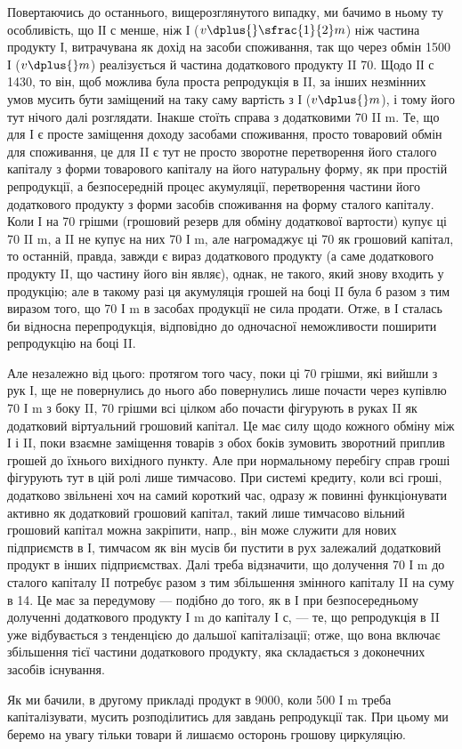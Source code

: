 
Повертаючись до останнього, вищерозглянутого випадку, ми бачимо
в ньому ту особливість, що ІІ с менше, ніж І ($v \dplus{} \sfrac{1}{2} m$) ніж частина
продукту І, витрачувана як дохід на засоби споживання, так що через
обмін 1500 І ($v \dplus{} m$) реалізується й частина додаткового продукту II \deq{} 70.
Щодо ІІ с \deq{} 1430, то він, щоб можлива була проста репродукція в II,
за інших незмінних умов мусить бути заміщений на таку саму вартість
з І ($v \dplus{} m$), і тому його тут нічого далі розглядати. Інакше стоїть
справа з додатковими 70 II m. Те, що для І є просте заміщення доходу
засобами споживання, просто товаровий обмін для споживання, це для II
є тут не просто зворотне перетворення його сталого капіталу з форми
товарового капіталу на його натуральну форму, як при простій репродукції,
а безпосередній процес акумуляції, перетворення частини його
додаткового продукту з форми засобів споживання на форму сталого
капіталу. Коли І на 70 грішми (грошовий резерв для обміну
додаткової вартости) купує ці 70 II m, а II не купує на них 70 І m, але
нагромаджує ці 70 як грошовий капітал, то останній, правда,
завжди є вираз додаткового продукту (а саме додаткового продукту II,
що частину його він являє), однак, не такого, який знову входить у
продукцію; але в такому разі ця акумуляція грошей на боці II була б
разом з тим виразом того, що 70 І m в засобах продукції не сила продати.
Отже, в І сталась би відносна перепродукція, відповідно до одночасної
неможливости поширити репродукцію на боці II.

Але незалежно від цього: протягом того часу, поки ці 70 грішми,
які вийшли з рук І, ще не повернулись до нього або повернулись лише
почасти через купівлю 70 І m з боку II, 70 грішми всі цілком або почасти
фігурують в руках II як додатковий віртуальний грошовий капітал.
Це має силу щодо кожного обміну між І і II, поки взаємне заміщення
товарів з обох боків зумовить зворотний приплив грошей до їхнього
вихідного пункту. Але при нормальному перебігу справ гроші
фігурують тут в цій ролі лише тимчасово. При системі кредиту, коли
всі гроші, додатково звільнені хоч на самий короткий час, одразу ж повинні
функціонувати активно як додатковий грошовий капітал, такий лише
тимчасово вільний грошовий капітал можна закріпити, напр., він може
служити для нових підприємств в І, тимчасом як він мусів би пустити в
рух залежалий додатковий продукт в інших підприємствах. Далі треба
відзначити, що долучення 70 І m до сталого капіталу II потребує разом
з тим збільшення змінного капіталу II на суму в 14. Це має за передумову
— подібно до того, як в І при безпосередньому долученні додаткового
продукту І m до капіталу І с, — те, що репродукція в II уже відбувається
з тенденцією до дальшої капіталізації; отже, що вона включає збільшення
тієї частини додаткового продукту, яка складається з доконечних засобів
існування.

Як ми бачили, в другому прикладі продукт в 9000, коли 500 І m
треба капіталізувати, мусить розподілитись для завдань репродукції так.
При цьому ми беремо на увагу тільки товари й лишаємо осторонь грошову
циркуляцію.
